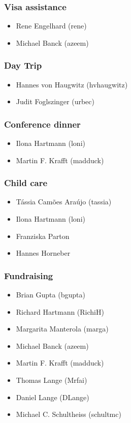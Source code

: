 \documentclass[t]{beamer}
\begin{document}
\begin{frame}
	\frametitle{Visa assistance}
	\begin{itemize}
		\item Rene Engelhard (rene)
		\item Michael Banck (azeem)
	\end{itemize}
\end{frame}

\begin{frame}
	\frametitle{Day Trip}
	\begin{itemize}
		\item Hannes von Haugwitz (hvhaugwitz)
		\item Judit Foglszinger (urbec)
	\end{itemize}
\end{frame}

\begin{frame}
	\frametitle{Conference dinner}
	\begin{itemize}
		\item Ilona Hartmann (loni)
		\item Martin F. Krafft (madduck)
	\end{itemize}
\end{frame}

\begin{frame}
	\frametitle{Child care}
	\begin{itemize}
		\item Tássia Camões Araújo (tassia)
		\item Ilona Hartmann (loni)
		\item Franziska Parton
		\item Hannes Horneber
	\end{itemize}
\end{frame}

\begin{frame}
	\frametitle{Fundraising}
	\begin{itemize}
		\item Brian Gupta (bgupta)
		\item Richard Hartmann (RichiH)
		\item Margarita Manterola (marga)
		\item Michael Banck (azeem)
		\item Martin F. Krafft (madduck)
		\item Thomas Lange (Mrfai)
		\item Daniel Lange (DLange)
		\item Michael C. Schultheiss (schultmc)
	\end{itemize}
\end{frame}
\end{document}
